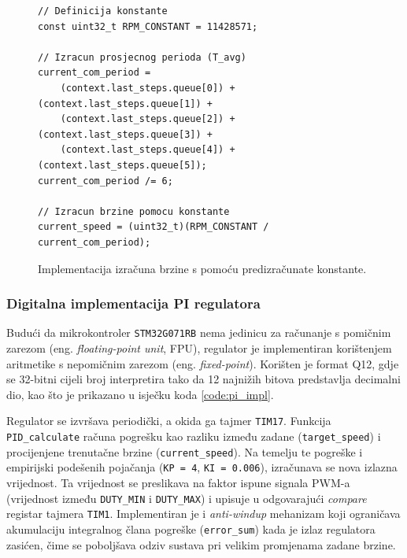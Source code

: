 \documentclass[diplomskirad, upload]{fer}
\begin{document}
\begin{figure}[h!]
	\begin{verbatim}
// Definicija konstante
const uint32_t RPM_CONSTANT = 11428571;

// Izracun prosjecnog perioda (T_avg)
current_com_period =
    (context.last_steps.queue[0]) + (context.last_steps.queue[1]) +
    (context.last_steps.queue[2]) + (context.last_steps.queue[3]) +
    (context.last_steps.queue[4]) + (context.last_steps.queue[5]);
current_com_period /= 6;

// Izracun brzine pomocu konstante
current_speed = (uint32_t)(RPM_CONSTANT / current_com_period);
\end{verbatim}
	\caption{Implementacija izračuna brzine s pomoću predizračunate konstante.}
	\label{code:rpm_constant}
\end{figure}

\subsubsection{Digitalna implementacija PI regulatora}
\label{sssec:pi_regulator}

Budući da mikrokontroler \texttt{STM32G071RB} nema jedinicu za računanje s
pomičnim zarezom (eng. \textit{floating-point unit}, FPU), regulator je
implementiran korištenjem aritmetike s nepomičnim zarezom (eng.
\textit{fixed-point}). Korišten je format Q12, gdje se 32-bitni cijeli broj
interpretira tako da 12 najnižih bitova predstavlja decimalni dio, kao što je
prikazano u isječku koda \ref{code:pi_impl}.

Regulator se izvršava periodički, a okida ga tajmer \texttt{TIM17}. Funkcija
\texttt{PID\_calculate} računa pogrešku kao razliku između zadane
(\texttt{target\_speed}) i procijenjene trenutačne brzine
(\texttt{current\_speed}). Na temelju te pogreške i empirijski podešenih
pojačanja (\texttt{KP = 4}, \texttt{KI = 0.006}), izračunava se nova izlazna
vrijednost. Ta vrijednost se preslikava na faktor ispune signala PWM-a
(vrijednost između \texttt{DUTY\_MIN} i \texttt{DUTY\_MAX}) i upisuje u
odgovarajući \textit{compare} registar tajmera \texttt{TIM1}. Implementiran je
i \textit{anti-windup} mehanizam koji ograničava akumulaciju integralnog člana
pogreške (\texttt{error\_sum}) kada je izlaz regulatora zasićen, čime se
poboljšava odziv sustava pri velikim promjenama zadane brzine.
\end{document}
